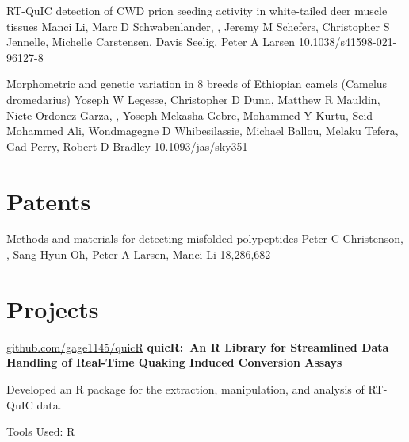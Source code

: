\documentclass{resume}
\begin{document}
\begin{samepage}
            {RT-QuIC detection of CWD prion seeding activity in white-tailed deer muscle tissues}
            {Manci Li, Marc D Schwabenlander, \me{}, Jeremy M Schefers, Christopher S Jennelle, Michelle Carstensen, Davis Seelig, Peter A Larsen}
            {10.1038/s41598-021-96127-8}

            {Morphometric and genetic variation in 8 breeds of Ethiopian camels (Camelus dromedarius)}
            {Yoseph W Legesse, Christopher D Dunn, Matthew R Mauldin, Nicte Ordonez-Garza, \me{}, Yoseph Mekasha Gebre, Mohammed Y Kurtu, Seid Mohammed Ali, Wondmagegne D Whibesilassie, Michael Ballou, Melaku Tefera, Gad Perry, Robert D Bradley}
            {10.1093/jas/sky351}

        \end{samepage}


    \section{Patents}
        \begin{samepage}
            {Methods and materials for detecting misfolded polypeptides}
            {Peter C Christenson, \me{}, Sang-Hyun Oh, Peter A Larsen, Manci Li}
            {18,286,682}
        \end{samepage}
    
    
    \section{Projects}
        \begin{twocolentry}{\href{https://github.com/gage1145/quicR}{github.com/gage1145/quicR}}
            \textbf{quicR:\ An R Library for Streamlined Data Handling of Real-Time Quaking Induced Conversion Assays}
        \end{twocolentry}

        \vspace{0.10 cm}
        \begin{onecolentry}
            \begin{highlights}
                \item Developed an R package for the extraction, manipulation, and analysis of RT-QuIC data.
                \item Tools Used: R
            \end{highlights}
        \end{onecolentry}
\end{document}
